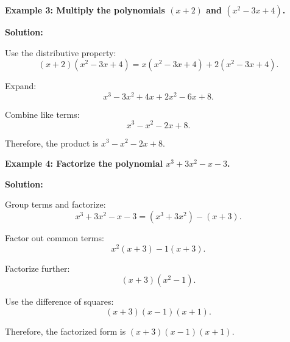 \begin{flushleft}
\textbf{Example 3: Multiply the polynomials $(x+2)$ and $(x^2 - 3x + 4)$.}

\vspace{0.5cm}
\textbf{Solution:}
\vspace{0.5cm}

Use the distributive property:
\[
(x+2)(x^2 - 3x + 4) = x(x^2 - 3x + 4) + 2(x^2 - 3x + 4).
\]

Expand:
\[
x^3 - 3x^2 + 4x + 2x^2 - 6x + 8.
\]

Combine like terms:
\[
x^3 - x^2 - 2x + 8.
\]

Therefore, the product is $x^3 - x^2 - 2x + 8$.
\end{flushleft}

\begin{flushleft}
\textbf{Example 4: Factorize the polynomial $x^3 + 3x^2 - x - 3$.}

\vspace{0.5cm}
\textbf{Solution:}
\vspace{0.5cm}

Group terms and factorize:
\[
x^3 + 3x^2 - x - 3 = (x^3 + 3x^2) - (x + 3).
\]

Factor out common terms:
\[
x^2(x + 3) - 1(x + 3).
\]

Factorize further:
\[
(x + 3)(x^2 - 1).
\]

Use the difference of squares:
\[
(x + 3)(x - 1)(x + 1).
\]

Therefore, the factorized form is $(x + 3)(x - 1)(x + 1)$.
\end{flushleft}

